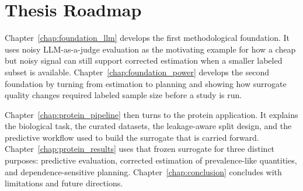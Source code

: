 \section{Thesis Roadmap}

Chapter~\ref{chap:foundation_llm} develops the first methodological foundation. It uses noisy LLM-as-a-judge evaluation as the motivating example for how a cheap but noisy signal can still support corrected estimation when a smaller labeled subset is available. Chapter~\ref{chap:foundation_power} develops the second foundation by turning from estimation to planning and showing how surrogate quality changes required labeled sample size before a study is run.

Chapter~\ref{chap:protein_pipeline} then turns to the protein application. It explains the biological task, the curated datasets, the leakage-aware split design, and the predictive workflow used to build the surrogate that is carried forward. Chapter~\ref{chap:protein_results} uses that frozen surrogate for three distinct purposes: predictive evaluation, corrected estimation of prevalence-like quantities, and dependence-sensitive planning. Chapter~\ref{chap:conclusion} concludes with limitations and future directions.
